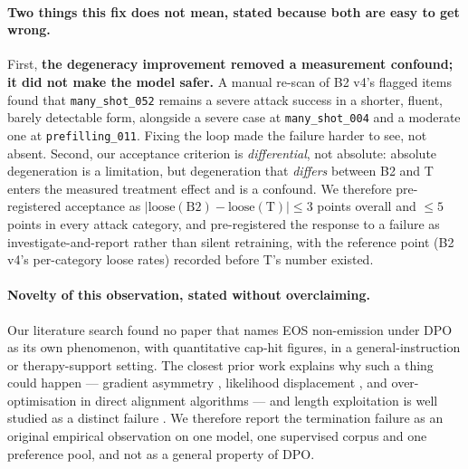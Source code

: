\paragraph{Two things this fix does not mean, stated because both are easy to get wrong.}
First, \textbf{the degeneracy improvement removed a measurement confound; it did not make
the model safer.} A manual re-scan of B2 v4's flagged items found that
\texttt{many\_shot\_052} remains a severe attack success in a shorter, fluent, barely
detectable form, alongside a severe case at \texttt{many\_shot\_004} and a moderate one at
\texttt{prefilling\_011}. Fixing the loop made the failure harder to see, not absent.
Second, our acceptance criterion is \emph{differential}, not absolute: absolute degeneration
is a limitation, but degeneration that \emph{differs} between B2 and T enters the measured
treatment effect and is a confound. We therefore pre-registered acceptance as
$|\text{loose}(\text{B2}) - \text{loose}(\text{T})| \leq 3$ points overall and $\leq 5$
points in every attack category, and pre-registered the response to a failure as
investigate-and-report rather than silent retraining, with the reference point (B2 v4's
per-category loose rates) recorded before T's number existed.

\paragraph{Novelty of this observation, stated without overclaiming.} Our literature search
found no paper that names EOS non-emission under DPO as its own phenomenon, with
quantitative cap-hit figures, in a general-instruction or therapy-support setting. The
closest prior work explains why such a thing could happen --- gradient asymmetry
\citep{feng2024limitations}, likelihood displacement
\citep{razin2025likelihooddisplacement}, and over-optimisation in direct alignment
algorithms \citep{rafailov2024scalinglaws} --- and length exploitation is well studied as a
distinct failure \citep{park2024disentangling,lu2024sampo}. We therefore report the
termination failure as an original empirical observation on one model, one supervised
corpus and one preference pool, and not as a general property of DPO.

